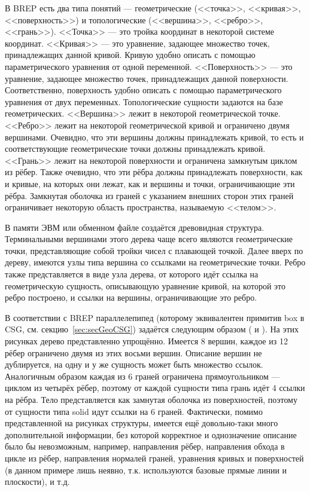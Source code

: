 В BREP есть два типа понятий --- геометрические (<<точка>>, <<кривая>>, <<поверхность>>) и топологические (<<вершина>>, <<ребро>>, <<грань>>). <<Точка>> --- это тройка координат в некоторой системе координат. <<Кривая>> --- это уравнение, задающее множество точек, принадлежащих данной кривой. Кривую удобно описать с помощью параметрического уравнения от одной переменной. <<Поверхность>> --- это уравнение, задающее множество точек, принадлежащих данной поверхности. Соответственно, поверхность удобно описать с помощью параметрического уравнения от двух переменных. Топологические сущности задаются на базе геометрических. <<Вершина>> лежит в некоторой геометрической точке. <<Ребро>> лежит на некоторой геометрической кривой и ограничено двумя вершинами. Очевидно, что эти вершины должны принадлежать кривой, то есть и соответствующие геометрические точки должны принадлежать кривой. <<Грань>> лежит на некоторой поверхности и ограничена замкнутым циклом из рёбер. Также очевидно, что эти рёбра должны принадлежать поверхности, как и кривые, на которых они лежат, как и вершины и точки, ограничивающие эти рёбра. Замкнутая оболочка из граней с указанием внешних сторон этих граней ограничивает некоторую область пространства, называемую <<телом>>.

В памяти ЭВМ или обменном файле создаётся древовидная структура. Терминальными вершинами этого дерева чаще всего являются геометрические точки, представляющие собой тройки чисел с плавающей точкой. Далее вверх по дереву, имеются узлы типа вершина со ссылками на геометрические точки. Ребро также представляется в виде узла дерева, от которого идёт ссылка на геометрическую сущность, описывающую уравнение кривой, на которой это ребро построено, и ссылки на вершины, ограничивающие это ребро.

В соответствии с BREP параллелепипед (которому эквивалентен примитив box в CSG, см. секцию~\ref{sec:secGeoCSG}) задаётся следующим образом ( и ). На этих рисунках дерево представленно упрощённо. Имеется 8 вершин, каждое из 12 рёбер ограничено двумя из этих восьми вершин. Описание вершин не дублируется, на одну и у же сущность может быть множество ссылок. Аналогичным образом каждая из 6 граней ограничена прямоугольником --- циклом из четырёх рёбер, поэтому от каждой сущности типа грань идёт 4 ссылки на рёбра. Тело представляется как замнутая оболочка из поверхностей, поэтому от сущности типа solid идут ссылки на 6 граней. Фактически, помимо представленной на рисунках структуры, имеется ещё довольно-таки много дополнительной информации, без которой корректное и однозначение описание было бы невозможным, например, направления рёбер, направления обхода в цикле из рёбер, направления нормалей граней, уравнения кривых и поверхностей (в данном примере лишь неявно, т.к. используются базовые прямые линии и плоскости), и т.д.

